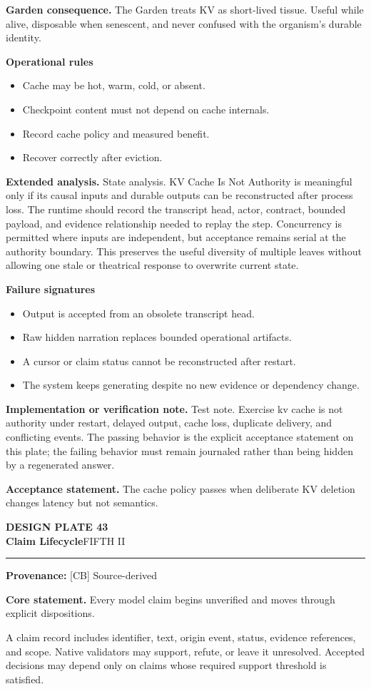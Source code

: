 \documentclass[10pt,letterpaper,oneside]{article}
\newcommand{\prov}[1]{\textcolor{gardenBlue}{\sffamily\footnotesize\textbf{Provenance:} #1}}
\newcommand{\platetitle}[3]{%
  \begin{minipage}[t][0.54in][t]{\textwidth}
  {\sffamily\bfseries\color{gardenDeep}\fontsize{9}{10}\selectfont DESIGN PLATE #1}\\[-1pt]
  {\sffamily\bfseries\color{gardenInk}\fontsize{16.5}{18}\selectfont #2}\hfill{\sffamily\color{gardenGreen}\large #3}
  \end{minipage}\vspace{-2pt}\hrule\vspace{5pt}}
\begin{document}
\textbf{Garden consequence.} The Garden treats KV as short-lived tissue. Useful while alive, disposable when senescent, and never confused with the organism's durable identity.

\textbf{Operational rules}
\begin{itemize}
\item Cache may be hot, warm, cold, or absent.
\item Checkpoint content must not depend on cache internals.
\item Record cache policy and measured benefit.
\item Recover correctly after eviction.
\end{itemize}
\textbf{Extended analysis.} State analysis. KV Cache Is Not Authority is meaningful only if its causal inputs and durable outputs can be reconstructed after process loss. The runtime should record the transcript head, actor, contract, bounded payload, and evidence relationship needed to replay the step. Concurrency is permitted where inputs are independent, but acceptance remains serial at the authority boundary. This preserves the useful diversity of multiple leaves without allowing one stale or theatrical response to overwrite current state.

\textbf{Failure signatures}
\begin{itemize}
\item Output is accepted from an obsolete transcript head.
\item Raw hidden narration replaces bounded operational artifacts.
\item A cursor or claim status cannot be reconstructed after restart.
\item The system keeps generating despite no new evidence or dependency change.
\end{itemize}
\textbf{Implementation or verification note.} Test note. Exercise kv cache is not authority under restart, delayed output, cache loss, duplicate delivery, and conflicting events. The passing behavior is the explicit acceptance statement on this plate; the failing behavior must remain journaled rather than being hidden by a regenerated answer.

\begin{acceptbox}
\textbf{Acceptance statement.} The cache policy passes when deliberate KV deletion changes latency but not semantics.
\end{acceptbox}
\newpage
\platetitle{43}{Claim Lifecycle}{FIFTH II}
\prov{[CB] Source-derived}
\fontsize{8.85}{10.45}\selectfont
\begin{corebox}
\textbf{Core statement.} Every model claim begins unverified and moves through explicit dispositions.
\end{corebox}
A claim record includes identifier, text, origin event, status, evidence references, and scope. Native validators may support, refute, or leave it unresolved. Accepted decisions may depend only on claims whose required support threshold is satisfied.
\end{document}
